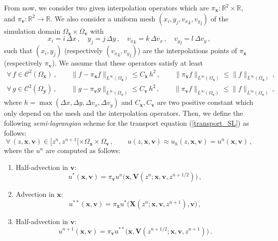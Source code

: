 \documentclass[10pt]{article}
\newcommand{\R}{{\mathbb R}}
\newcommand{\Cl}{{\mathcal C}}
\begin{document}
\indent From now, we consider two given interpolation operators which are $\pi_{\mathbf{x}} : \R^{2} \times \R$, and $\pi_{\mathbf{v}} : \R^{2} \to \R$. We also consider a uniform mesh $(x_{i},y_{j},{v_{x}}_{k},{v_{y}}_{l})$ of the simulation domain $\Omega_{\mathbf{x}} \times \Omega_{\mathbf{v}}$ with
\begin{equation}
x_{i} = i\,\Delta x \, , \quad y_{j} = j\,\Delta y \, , \quad {v_{x}}_{k} = k\,\Delta v_{x} \, , \quad {v_{y}}_{l} = l\,\Delta v_{y} \, ,
\end{equation}
such that $(x_{i},y_{j})$ (respectively $({v_{x}}_{k},{v_{y}}_{l})$) are the interpolations points of $\pi_{\mathbf{x}}$ (respectively $\pi_{\mathbf{v}}$). We assume that these operators satisfy at least
\begin{equation}
\begin{split}
\forall\,f \in \Cl^{2}(\Omega_{\mathbf{x}}) \, ,  \qquad \| f-\pi_{\mathbf{x}}f\|_{L^{\infty}(\Omega_{\mathbf{x}})} \leq C_{\mathbf{x}} \, h^{2} \, , \qquad \| \pi_{\mathbf{x}}f\|_{L^{\infty}(\Omega_{\mathbf{x}})} \leq \| f\|_{L^{\infty}(\Omega_{\mathbf{x}})} \, , \\
\forall\,g \in \Cl^{2}(\Omega_{\mathbf{y}}) \, ,  \qquad \| g-\pi_{\mathbf{v}}g\|_{L^{\infty}(\Omega_{\mathbf{v}})} \leq C_{\mathbf{v}} \, h^{2} \, , \qquad \| \pi_{\mathbf{v}}f\|_{L^{\infty}(\Omega_{\mathbf{v}})} \leq \| f\|_{L^{\infty}(\Omega_{\mathbf{v}})} \, ,
\end{split}
\end{equation}
where $h = \max(\Delta x,\Delta y,\Delta v_{x},\Delta v_{y})$ and $C_{\mathbf{x}},C_{\mathbf{v}}$ are two positive constant which only depend on the mesh and the interpolation operators. Then, we define the following \textit{semi-lagrangian} scheme for the transport equation (\ref{transport_SL}) as follows:
\begin{equation}
\forall\, (z,\mathbf{x},\mathbf{v}) \in [z^{n},z^{n+1}[ \times \Omega_{\mathbf{x}} \times \Omega_{\mathbf{v}} \, , \qquad u(z,\mathbf{x},\mathbf{v}) \approx u_{h}(z,\mathbf{x},\mathbf{v}) = u^{n}(\mathbf{x},\mathbf{v}) \, , 
\end{equation}
where the $u^{n}$ are computed as follows:
\begin{enumerate}
\item Half-advection in $\mathbf{v}$:
\begin{equation} \label{adv_v_1}
u^{*}(\mathbf{x},\mathbf{v}) = \pi_{\mathbf{v}}u^{n}\big(\mathbf{x}, \mathbf{V}(z^{n};\mathbf{x},\mathbf{v},z^{n+1/2}) \big) \, ,
\end{equation}
\item Advection in $\mathbf{x}$:
\begin{equation} \label{adv_x}
u^{**}(\mathbf{x},\mathbf{v}) = \pi_{\mathbf{x}}u^{*}\big(\mathbf{X}(z^{n};\mathbf{x},\mathbf{v},z^{n+1}),\mathbf{v}\big) \, ,
\end{equation}
\item Half-advection in $\mathbf{v}$:
\begin{equation} \label{adv_v_2}
u^{n+1}(\mathbf{x},\mathbf{v}) = \pi_{\mathbf{v}}u^{**}\big(\mathbf{x}, \mathbf{V}(z^{n+1/2};\mathbf{x},\mathbf{v},z^{n+1}) \big) \, .
\end{equation}
\end{enumerate}
\end{document}
